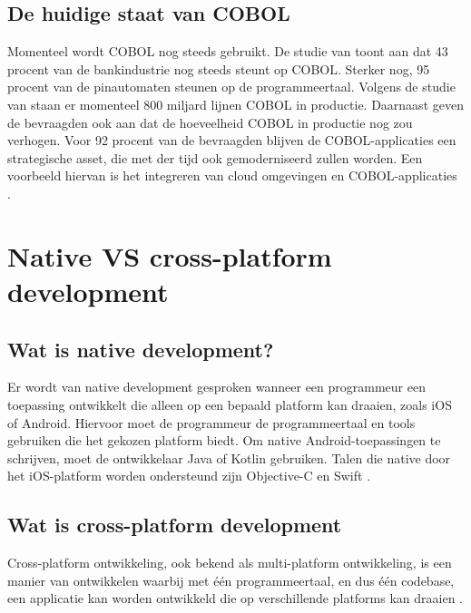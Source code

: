 \subsection{De huidige staat van COBOL}
Momenteel wordt COBOL nog steeds gebruikt. De studie van \textcite{Reuters2017} toont aan dat 43 procent van de bankindustrie nog steeds steunt op COBOL. Sterker nog, 95 procent van de pinautomaten steunen op de programmeertaal. Volgens de studie van \textcite{MicroFocus2022} staan er momenteel 800 miljard lijnen COBOL in productie. Daarnaast geven de bevraagden ook aan dat de hoeveelheid COBOL in productie nog zou verhogen. 
Voor 92 procent van de bevraagden blijven de COBOL-applicaties een strategische asset, die met der tijd ook gemoderniseerd zullen worden. Een voorbeeld hiervan is het integreren van cloud omgevingen en COBOL-applicaties \autocite{MicroFocus2022}.

\section{Native VS cross-platform development}
\subsection{Wat is native development?}
Er wordt van native development gesproken wanneer een programmeur een toepassing ontwikkelt die alleen op een bepaald platform kan draaien, zoals iOS of Android. Hiervoor moet de programmeur de programmeertaal en tools \autocite{Marchuk} gebruiken die het gekozen platform biedt.
Om native Android-toepassingen te schrijven, moet de ontwikkelaar Java of Kotlin gebruiken. Talen die native door het iOS-platform worden ondersteund zijn Objective-C en Swift \autocite{Schmitt2022}.

\subsection{Wat is cross-platform development}
Cross-platform ontwikkeling, ook bekend als multi-platform ontwikkeling, is een manier van ontwikkelen waarbij met één programmeertaal, en dus één codebase, een applicatie kan worden ontwikkeld die op verschillende platforms kan draaien \autocite{KotlinFoundation2022}.

